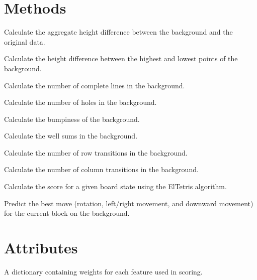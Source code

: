 \documentclass[letterpaper,10pt,english]{sphinxmanual}
\begin{document}
\section{Methods}
\label{\detokenize{index:methods}}\begin{description}
\sphinxAtStartPar
Calculate the aggregate height difference between the background and the original data.

\sphinxAtStartPar
Calculate the height difference between the highest and lowest points of the background.

\sphinxAtStartPar
Calculate the number of complete lines in the background.

\sphinxAtStartPar
Calculate the number of holes in the background.

\sphinxAtStartPar
Calculate the bumpiness of the background.

\sphinxAtStartPar
Calculate the well sums in the background.

\sphinxAtStartPar
Calculate the number of row transitions in the background.

\sphinxAtStartPar
Calculate the number of column transitions in the background.

\sphinxAtStartPar
Calculate the score for a given board state using the El\sphinxhyphen{}Tetris algorithm.

\sphinxAtStartPar
Predict the best move (rotation, left/right movement, and downward movement) for the current block on the background.

\end{description}


\section{Attributes}
\label{\detokenize{index:attributes}}\begin{description}
\sphinxAtStartPar
A dictionary containing weights for each feature used in scoring.

\end{description}
\end{document}
